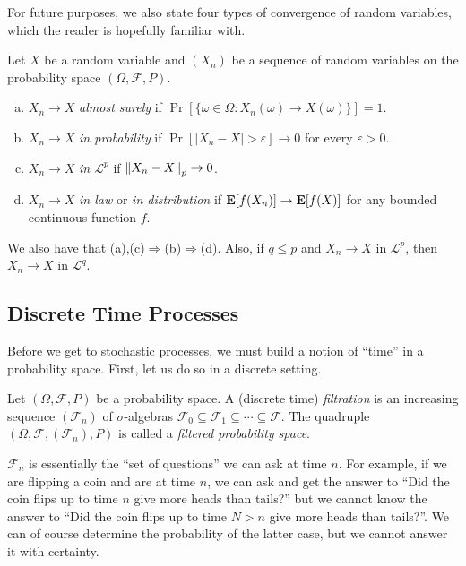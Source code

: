 For future purposes, we also state four types of convergence of random variables, which the reader is hopefully familiar with.
\begin{definition}
	Let $X$ be a random variable and $(X_n)$ be a sequence of random variables on the probability space $(\Omega,\mathcal{F},P)$.
	\begin{enumerate}[(a)]
		\item $X_n\to X$ \textit{almost surely} if $\Pr[\{\omega\in\Omega : X_n(\omega)\to X(\omega)\}]=1$.
		\item $X_n\to X$ \textit{in probability} if $\Pr[|X_n-X|>\varepsilon]\to 0$ for every $\varepsilon>0$.
		\item $X_n\to X$ \textit{in $\mathcal{L}^p$} if $\left\lVert X_n-X\right\rVert_p\to 0$.
		\item $X_n\to X$ \textit{in law} or \textit{in distribution} if $\textbf{E}[f(X_n)]\to\textbf{E}[f(X)]$ for any bounded continuous function $f$. 
 	\end{enumerate}
\end{definition}

We also have that (a),(c)$\Rightarrow$(b)$\Rightarrow$(d). Also, if $q\leq p$ and $X_n\to X$ in $\mathcal{L}^p$, then $X_n\to X$ in $\mathcal{L}^q$.

\subsection{Discrete Time Processes}

Before we get to stochastic processes, we must build a notion of ``time'' in a probability space. First, let us do so in a discrete setting.

\begin{definition}
	Let $(\Omega,\mathcal{F},P)$ be a probability space. A (discrete time) \textit{filtration} is an increasing sequence $(\mathcal{F}_n)$ of $\sigma$-algebras $\mathcal{F}_0\subseteq\mathcal{F}_1\subseteq\cdots\subseteq\mathcal{F}$. The quadruple $(\Omega,\mathcal{F},(\mathcal{F}_n),P)$ is called a \textit{filtered probability space}.
\end{definition}

$\mathcal{F}_n$ is essentially the ``set of questions'' we can ask at time $n$. For example, if we are flipping a coin and are at time $n$, we can ask and get the answer to ``Did the coin flips up to time $n$ give more heads than tails?'' but we cannot know the answer to ``Did the coin flips up to time $N>n$ give more heads than tails?''. We can of course determine the probability of the latter case, but we cannot answer it with certainty.

